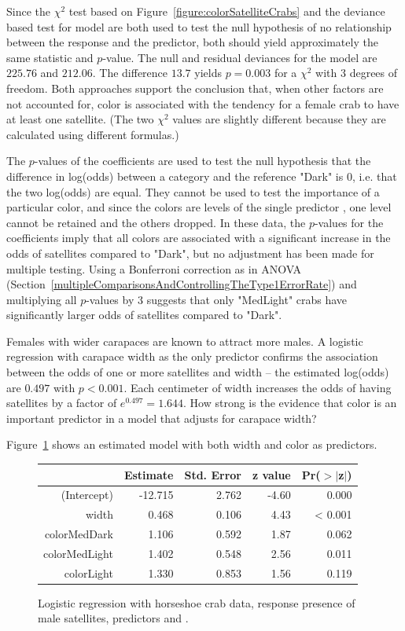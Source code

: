 Since the $\chi^2$ test based on Figure~\ref{figure:colorSatelliteCrabs} and the deviance based test for model are both used to test the null hypothesis of no relationship between the response and the predictor, both should yield approximately the same statistic and $p$-value. The null and residual deviances for the model are $225.76$ and $212.06$.  The difference $13.7$ yields $p = 0.003$ for a $\chi^2$ with 3 degrees of freedom.  Both approaches support the conclusion that, when other factors are not accounted for, color is associated with the tendency for a female crab to have at least one satellite.  (The two $\chi^2$ values are slightly different because they are calculated using different formulas.)

The $p$-values of the coefficients are used to test the null hypothesis that the difference in log(odds) between a category and the reference "Dark" is 0, i.e. that the two log(odds) are equal.  They cannot be used to test the importance of a particular color, and since the colors are levels of the single predictor , one level cannot be retained and the others dropped.  In these data, the $p$-values for the coefficients imply that all colors are associated with a significant increase in the odds of satellites compared to "Dark", but no adjustment has been made for multiple testing.  Using a Bonferroni correction as in ANOVA (Section~\ref{multipleComparisonsAndControllingTheType1ErrorRate}) and multiplying all $p$-values by 3 suggests that only "MedLight" crabs have significantly larger odds of satellites compared to "Dark".

Females with wider carapaces are known to attract more males. A logistic regression with carapace width as the only predictor confirms the association between the odds of one or more satellites and width -- the estimated log(odds) are $0.497$ with $p < 0.001$. Each centimeter of width increases the odds of having satellites by a factor of $e^{0.497} = 1.644$.  How strong is the evidence that color is an important predictor in a model that adjusts for carapace width?

Figure~\ref{figure:satellitesWidthColorCrabsLogReg} shows an estimated model with both width and color as predictors.
\begin{figure}[ht]
\centering
\begin{tabular}{rrrrr}
  \hline
 & Estimate & Std. Error & z value & Pr($>$$|$z$|$) \\
  \hline
(Intercept) & -12.715 & 2.762 & -4.60 & 0.000 \\
  width & 0.468 & 0.106 & 4.43 & < 0.001 \\
  colorMedDark & 1.106 & 0.592 & 1.87 & 0.062 \\
  colorMedLight & 1.402 & 0.548 & 2.56 & 0.011 \\
  colorLight & 1.330 & 0.853 & 1.56 & 0.119 \\
   \hline
\end{tabular}
\caption{Logistic regression with horseshoe crab data, response
       presence of male satellites, predictors  and .}
\label{figure:satellitesWidthColorCrabsLogReg}
\end{figure}

